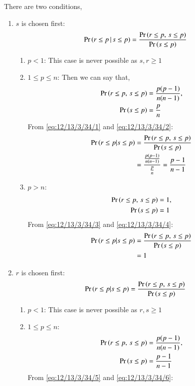 There are two conditions, 
\begin{enumerate}
\item  $s$ is chosen first:
\begin{align}
\Pr\left(r\le p\,|\,s\le p\right) = \frac{\Pr\left(r \le p, \, s \le p\right)}{\Pr\left(s \le p\right)}
\end{align}
\begin{enumerate}
\item $p<1$:
This case is never possible as $s,r \ge 1$
\item $1 \le p \le n$:
Then we can say that,
\begin{align}
\pr{r \le p, \, s \le p} &= \frac{p(p-1)}{n(n-1)} \label{eq:12/13/3/34/1},\\
\pr{s \le p} &= \frac{p}{n} \label{eq:12/13/3/34/2}
\end{align}
From \eqref{eq:12/13/3/34/1} and \eqref{eq:12/13/3/34/2}:
\begin{align}
\Pr\left(r\le p|s\le p\right) &= \frac{\Pr\left(r \le p, \, s \le p\right)}{\Pr\left(s \le p\right)}\\
&= \frac{\frac{p(p-1)}{n(n-1)}}{\frac{p}{n}}
=\frac{p-1}{n-1}
\end{align}
\item $p>n$:
\begin{align}
\pr{r \le p, \, s \le p} &= 1 \label{eq:12/13/3/34/3},\\
\pr{s \le p} &= 1 \label{eq:12/13/3/34/4}
\end{align}
From \eqref{eq:12/13/3/34/3} and \eqref{eq:12/13/3/34/4}:
\begin{align}
\Pr\left(r\le p|s\le p\right) &= \frac{\Pr\left(r \le p, \, s \le p\right)}{\Pr\left(s \le p\right)}\\
&= 1 
\end{align}
\end{enumerate}
\item  $r$ is chosen first:
\begin{align}
\Pr\left(r\le p|s\le p\right) = \frac{\Pr\left(r \le p, \, s \le p\right)}{\Pr\left(s \le p\right)}
\end{align}
\begin{enumerate}
\item $p<1$:
This case is never possible as $r,s \ge 1$
\item $1 \le p \le n$:
\begin{align}
\pr{r \le p, \, s \le p} &= \frac{p(p-1)}{n(n-1)} \label{eq:12/13/3/34/5},\\
\pr{s \le p} &= \frac{p-1}{n-1} \label{eq:12/13/3/34/6}
\end{align}
From \eqref{eq:12/13/3/34/5} and \eqref{eq:12/13/3/34/6}:

\end{enumerate}
\end{enumerate}
